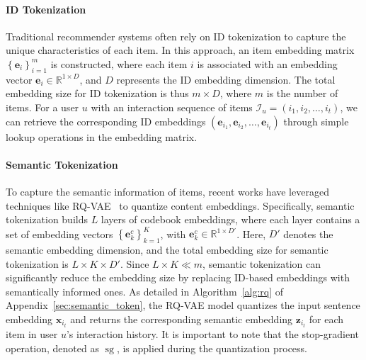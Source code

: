 \paragraph{\textbf{ID Tokenization}} 
Traditional recommender systems often rely on ID tokenization to capture the unique characteristics of each item. In this approach, an item embedding matrix 
$\left\{\boldsymbol{e}_{i}\right\}_{i=1}^m$ is constructed, where each item \( i \) is associated with an embedding vector 
$\boldsymbol{e}_i \in \mathbb{R}^{1 \times D}$, and \( D \) represents the ID embedding dimension. The total embedding size for ID tokenization is thus $m \times D$, where \( m \) is the number of items. For a user \( u \) with an interaction sequence of items $\mathcal{I}_{u} = (i_{1}, i_{2}, \ldots, i_{t})$, we can retrieve the corresponding ID embeddings $(\boldsymbol{e}_{i_{1}}, \boldsymbol{e}_{i_{2}}, \ldots, \boldsymbol{e}_{i_{t}})$ through simple lookup operations in the embedding matrix.
\paragraph{\textbf{Semantic Tokenization}} 
To capture the semantic information of items, recent works have leveraged techniques like RQ-VAE~\citep{rajput2024recommender} to quantize content embeddings. Specifically, semantic tokenization builds $L$ layers of codebook embeddings, where each layer contains a set of embedding vectors $\left\{\boldsymbol{e}^c_{k}\right\}_{k=1}^K$, with $\boldsymbol{e}^c_{k} \in \mathbb{R}^{1 \times D'}$. Here, $D'$ denotes the semantic embedding dimension, and the total embedding size for semantic tokenization is $L \times K \times D'$. Since $L \times K \ll m$, semantic tokenization can significantly reduce the embedding size by replacing ID-based embeddings with semantically informed ones. As detailed in Algorithm~\ref{alg:rq} of Appendix~\ref{sec:semantic_token}, the RQ-VAE model quantizes the input sentence embedding $\boldsymbol{x}_{i_{t}}$ and returns the corresponding semantic embedding $\boldsymbol{z}_{i_{t}}$ for each item in user \( u \)'s interaction history. It is important to note that the stop-gradient operation, denoted as $\operatorname{sg}$, is applied during the quantization process.



